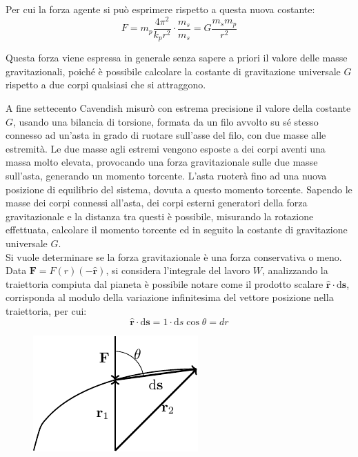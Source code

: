 \documentclass{article}
\newcommand{\vect}[1]{\boldsymbol{\mathbf{#1}}}
\newcommand{\df}{\mathrm{d}}
\numberwithin{equation}{subsection}
\begin{document}
Per cui la forza agente si può esprimere rispetto a questa nuova costante:
\begin{equation}
    F=m_p\displaystyle\frac{4\pi^2}{k_pr^2}\cdot\frac{m_s}{m_s}=G\frac{m_sm_p}{r^2}
\end{equation}

Questa forza viene espressa in generale senza sapere a priori il valore delle masse gravitazionali, poiché è possibile calcolare la costante di gravitazione universale $G$ 
rispetto a due corpi qualsiasi che si attraggono. 


A fine settecento Cavendish misurò con estrema precisione il valore della costante $G$, usando una bilancia di torsione, formata da un filo avvolto 
su sé stesso connesso ad un'asta in grado di ruotare sull'asse del filo, con due masse alle estremità. Le due masse agli estremi vengono esposte 
a dei corpi aventi una massa molto elevata, provocando una forza gravitazionale sulle due masse sull'asta, generando un momento torcente. L'asta ruoterà fino ad una nuova 
posizione di equilibrio del sistema, dovuta a questo momento torcente. Sapendo le masse dei corpi connessi all'asta, dei corpi esterni generatori della forza 
gravitazionale e la distanza tra questi è possibile, misurando la rotazione effettuata, calcolare il momento torcente ed in seguito la costante di gravitazione universale $G$. 
\\
Si vuole determinare se la forza gravitazionale è una forza conservativa o meno. 
Data $\vect{F}=F(r)(-\hat{\vect{r}})$, si considera l'integrale del lavoro $W$, analizzando  
la traiettoria compiuta dal pianeta è possibile notare come il prodotto scalare $\hat{\vect{r}}\cdot \df\vect{s}$, corrisponda al modulo della variazione 
infinitesima del vettore posizione nella traiettoria, per cui:
\begin{equation*}
    \hat{\vect{r}}\cdot \df\vect{s}=1\cdot \df s\cos\theta=dr
\end{equation*}

\begin{figure}[H]%
    \centering
    \includegraphics{gravità.pdf}%
\end{figure}
\end{document}
